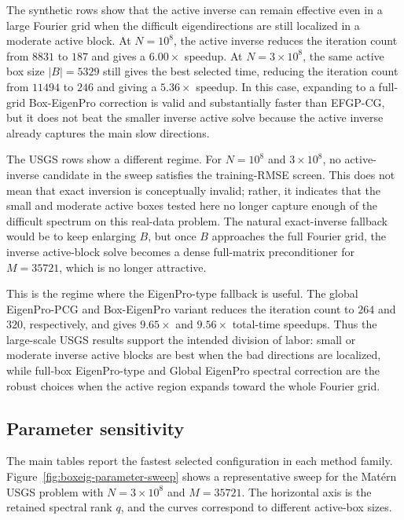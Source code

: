 The synthetic rows show that the active inverse can remain effective even in a
large Fourier grid when the difficult eigendirections are still localized in a
moderate active block. At \(N=10^8\), the active inverse reduces the
iteration count from \(8831\) to \(187\) and gives a \(6.00\times\) speedup.
At \(N=3\times10^8\), the same active box size \(|B|=5329\) still gives the
best selected time, reducing the iteration count from \(11494\) to \(246\) and
giving a \(5.36\times\) speedup. In this case, expanding to a full-grid
Box-EigenPro correction is valid and substantially faster than EFGP-CG, but it
does not beat the smaller inverse active solve because the active inverse already
captures the main slow directions.

The USGS rows show a different regime. For \(N=10^8\) and \(3\times10^8\), no
active-inverse candidate in the sweep satisfies the training-RMSE screen. This
does not mean that exact inversion is conceptually invalid; rather, it indicates
that the small and moderate active boxes tested here no longer capture enough
of the difficult spectrum on this real-data problem. The natural exact-inverse
fallback would be to keep enlarging \(B\), but once \(B\) approaches the full
Fourier grid, the inverse active-block solve becomes a dense full-matrix
preconditioner for \(M=35721\), which is no longer attractive.

This is the regime where the EigenPro-type fallback is useful. The global
EigenPro-PCG  and Box-EigenPro variant reduces the iteration count to \(264\) and \(320\), respectively, and gives \(9.65\times\) and \(9.56\times\) total-time speedups. Thus the large-scale USGS results support the intended division of labor: small or moderate inverse active blocks are best when the bad directions are localized, while full-box EigenPro-type and Global EigenPro spectral correction are the robust choices when the active region expands toward the whole Fourier grid.

\subsection{Parameter sensitivity}
\label{subsec:parameter-sensitivity}

The main tables report the fastest selected configuration in each method family. Figure~\ref{fig:boxeig-parameter-sweep} shows a representative sweep for the Mat\'ern USGS problem with \(N=3\times10^8\) and \(M=35721\). The horizontal axis is the retained spectral rank \(q\), and the curves correspond to different active-box sizes.

